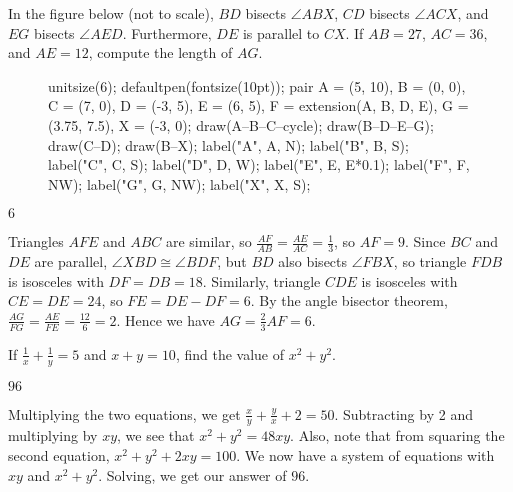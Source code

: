 \documentclass[11pt]{article}
\begin{document}
\begin{problem}
In the figure below (not to scale), $BD$ bisects $\angle ABX$, $CD$ bisects $\angle ACX$, and $EG$ bisects $\angle AED$. Furthermore, $DE$ is parallel to $CX$. If $AB = 27$, $AC = 36$, and $AE = 12$, compute the length of $AG$.	
\begin{figure}[h]
	\begin{center}
		\begin{asy}
			unitsize(6);
			defaultpen(fontsize(10pt));
			pair A = (5, 10), B = (0, 0), C = (7, 0), D = (-3, 5), E = (6, 5), F = extension(A, B, D, E), G = (3.75, 7.5), X = (-3, 0);
			draw(A--B--C--cycle);
			draw(B--D--E--G);
			draw(C--D);
			draw(B--X);
			label("A", A, N);
			label("B", B, S);
			label("C", C, S);
			label("D", D, W);
			label("E", E, E*0.1);
			label("F", F, NW);
			label("G", G, NW);
			label("X", X, S);
		\end{asy}
	\end{center}
\end{figure}
\end{problem}

\begin{answer}
$\boxed{6}$
\end{answer}

\begin{solution}
Triangles $AFE$ and $ABC$ are similar, so $\frac{AF}{AB} = \frac{AE}{AC} = \frac{1}{3}$, so $AF = 9$. Since $BC$ and $DE$ are parallel, $\angle XBD \cong \angle BDF$, but $BD$ also bisects $\angle FBX$, so triangle $FDB$ is isosceles with $DF = DB = 18$. Similarly, triangle $CDE$ is isosceles with $CE = DE = 24$, so $FE = DE - DF = 6$. By the angle bisector theorem, $\frac{AG}{FG} = \frac{AE}{FE} = \frac{12}{6} = 2$. Hence we have $AG = \frac{2}{3} AF = \boxed{6}$.
\end{solution}


\begin{problem}%
If $\frac{1}{x} + \frac{1}{y} = 5$ and $x+y=10$, find the value of $x^2+y^2$.
\end{problem}

\begin{answer}
$\boxed{96}$
\end{answer}

\begin{solution}
Multiplying the two equations, we get $\frac{x}{y} + \frac{y}{x} + 2 = 50$. Subtracting by 2 and multiplying by $xy$, we see that $x^2+y^2 = 48xy$. Also, note that from squaring the second equation, $x^2+ y^2 +2xy = 100$. We now have a system of equations with $xy$ and $x^2+y^2$. Solving, we get our answer of $\boxed{96}$.
\end{solution}
\end{document}
